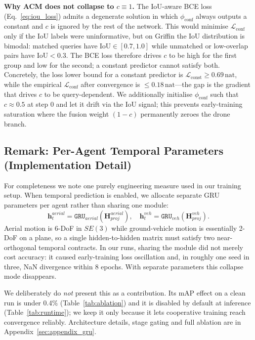 \documentclass[9.5pt,twocolumn,a4paper]{IEEEtran}
\def\mb#1{\mathbf{#1}}
\def\msc#1{\texttt{#1}}
\begin{document}
\textbf{Why ACM does not collapse to $c \equiv 1$.} The IoU-aware BCE loss (Eq.~\ref{eq:iou_loss}) admits a degenerate solution in which $\phi_{\text{conf}}$ always outputs a constant and $c$ is ignored by the rest of the network. This would minimise $\mathcal{L}_{\text{conf}}$ only if the IoU labels were uninformative, but on Griffin the IoU distribution is bimodal: matched queries have $\text{IoU} \in [0.7, 1.0]$ while unmatched or low-overlap pairs have $\text{IoU} < 0.3$. The BCE loss therefore drives $c$ to be high for the first group and low for the second; a constant predictor cannot satisfy both. Concretely, the loss lower bound for a constant predictor is $\mathcal{L}_{\text{const}} \ge 0.69\,\text{nat}$, while the empirical $\mathcal{L}_{\text{conf}}$ after convergence is $\le 0.18\,\text{nat}$---the gap is the gradient that drives $c$ to be query-dependent. We additionally initialise $\phi_{\text{conf}}$ such that $c \approx 0.5$ at step 0 and let it drift via the IoU signal; this prevents early-training saturation where the fusion weight $(1-c)$ permanently zeroes the drone branch.

\subsection{Remark: Per-Agent Temporal Parameters (Implementation Detail)}
\label{sec:dual_gru_remark}

For completeness we note one purely engineering measure used in our training setup. When temporal prediction is enabled, we allocate separate GRU parameters per agent rather than sharing one module:
\begin{equation}
    \mb{h}_t^{aerial} = \msc{GRU}_{aerial}(\mb{H}_{proj}^{aerial}), \quad
    \mb{h}_t^{veh} = \msc{GRU}_{veh}(\mb{H}_{proj}^{veh}).
    \label{eq:dual_gru}
\end{equation}
Aerial motion is 6-DoF in $SE(3)$ while ground-vehicle motion is essentially 2-DoF on a plane, so a single hidden-to-hidden matrix must satisfy two near-orthogonal temporal contracts. In our runs, sharing the module did not merely cost accuracy: it caused early-training loss oscillation and, in roughly one seed in three, NaN divergence within 8 epochs. With separate parameters this collapse mode disappears.

We deliberately do \emph{not} present this as a contribution. Its mAP effect on a clean run is under 0.4\% (Table~\ref{tab:ablation}) and it is disabled by default at inference (Table~\ref{tab:runtime}); we keep it only because it lets cooperative training reach convergence reliably. Architecture details, stage gating and full ablation are in Appendix~\ref{sec:appendix_gru}.
\end{document}
